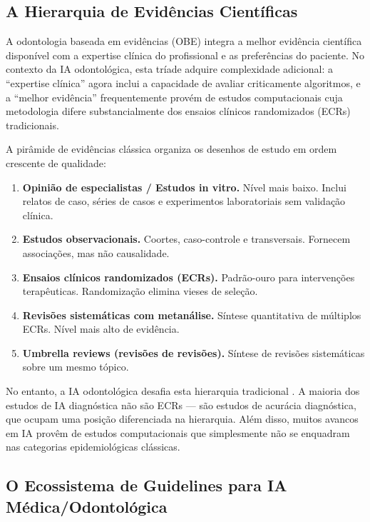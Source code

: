 \subsection{A Hierarquia de Evidências Científicas}

A odontologia baseada em evidências (OBE)  integra a melhor evidência científica disponível com a expertise clínica do profissional e as preferências do paciente. No contexto da IA odontológica, esta tríade adquire complexidade adicional: a ``expertise clínica'' agora inclui a capacidade de avaliar criticamente algoritmos, e a ``melhor evidência'' frequentemente provém de estudos computacionais cuja metodologia difere substancialmente dos ensaios clínicos randomizados (ECRs) tradicionais.

A pirâmide de evidências clássica organiza os desenhos de estudo em ordem crescente de qualidade:

\begin{enumerate}
    \item \textbf{Opinião de especialistas / Estudos in vitro.} Nível mais baixo. Inclui relatos de caso, séries de casos e experimentos laboratoriais sem validação clínica.
    \item \textbf{Estudos observacionais.} Coortes, caso-controle e transversais. Fornecem associações, mas não causalidade.
    \item \textbf{Ensaios clínicos randomizados (ECRs).} Padrão-ouro para intervenções terapêuticas. Randomização elimina vieses de seleção.
    \item \textbf{Revisões sistemáticas com metanálise.} Síntese quantitativa de múltiplos ECRs. Nível mais alto de evidência.
    \item \textbf{Umbrella reviews (revisões de revisões).} Síntese de revisões sistemáticas sobre um mesmo tópico.
\end{enumerate}

No entanto, a IA odontológica desafia esta hierarquia tradicional . A maioria dos estudos de IA diagnóstica não são ECRs — são estudos de acurácia diagnóstica, que ocupam uma posição diferenciada na hierarquia. Além disso, muitos avancos em IA provêm de estudos computacionais que simplesmente não se enquadram nas categorias epidemiológicas clássicas.

\subsection{O Ecossistema de Guidelines para IA Médica/Odontológica}

